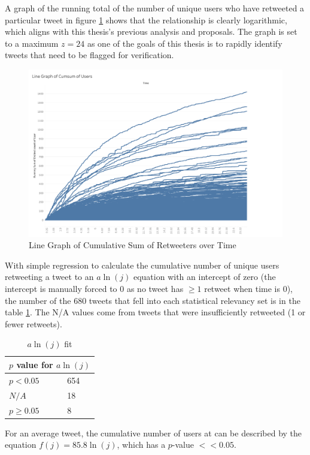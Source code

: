 \documentclass[preprint,review,12pt]{elsarticle}
\begin{document}
 
A graph of the running total of the number of unique users who have retweeted a particular tweet in figure \ref{fig:Users CumSum/Time} shows that the relationship is clearly logarithmic, which aligns with this thesis's previous analysis and proposals. The graph is set to a maximum $z = 24$ as one of the goals of this thesis is to rapidly identify tweets that need to be flagged for verification.
\begin{figure}[h!]
 \centering
  \includegraphics[width=12cm]{Linegraph cumsum users.png}
  \caption{Line Graph of Cumulative Sum of Retweeters over Time}\label{fig:Users CumSum/Time}
 \end{figure}

With simple regression to calculate the cumulative number of unique users retweeting a tweet to an $a\ln(j)$ equation with an intercept of zero (the intercept is manually forced to 0 as no tweet has $\geq 1$ retweet when time is 0), the number of the 680 tweets that fell into each statistical relevancy set is in the table \ref{Natural Log Fit}. The N/A values come from tweets that were insufficiently retweeted (1 or fewer retweets).   
\begin{table}[h!]
\centering
\begin{tabular}{ |p{3cm}|p{3cm}|  }
\hline
\multicolumn{2}{|c|}{$p$ value for $a\ln(j)$} \\
\hline
$p < 0.05$  & 654\\
$N/A$ & 18 \\
$ p \geq 0.05$ & 8 \\
\hline
\end{tabular}
\caption{$a\ln(j)$ fit}
\label{Natural Log Fit}
\end{table}

For an average tweet, the cumulative number of users at can be described by the equation $f(j)=85.8\ln(j)$, which has a $p$-value $<< 0.05$. 
\end{document}
